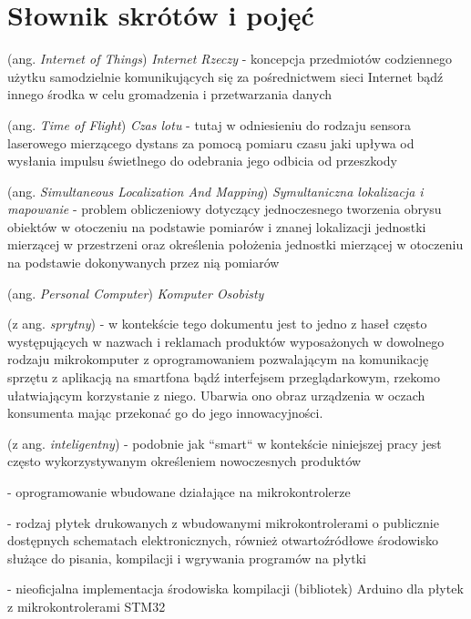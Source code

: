 \chapter*{Słownik skrótów i pojęć}\mbox{}
\label{sec:skroty}
\noindent
\begin{description}[labelwidth=*]
  \item  [IoT] (ang. \emph{Internet of Things}) \emph{Internet Rzeczy} - koncepcja przedmiotów codziennego użytku samodzielnie komunikujących się za pośrednictwem sieci Internet bądź innego środka w celu gromadzenia i przetwarzania danych
  
  \item [ToF] (ang. \emph{Time of Flight}) \emph{Czas lotu} - tutaj w odniesieniu do rodzaju sensora laserowego mierzącego dystans za pomocą pomiaru czasu jaki upływa od wysłania impulsu świetlnego do odebrania jego odbicia od przeszkody
  
  \item [SLAM] (ang. \emph{Simultaneous Localization And Mapping}) \emph{Symultaniczna lokalizacja i mapowanie} - problem obliczeniowy dotyczący jednoczesnego tworzenia obrysu obiektów w otoczeniu na podstawie pomiarów i znanej lokalizacji jednostki mierzącej w przestrzeni oraz określenia położenia jednostki mierzącej w otoczeniu na podstawie dokonywanych przez nią pomiarów
  
  \item [VSLAM]
  
  \item [LIDAR]
  
  \item [PC] (ang. \emph{Personal Computer}) \emph{Komputer Osobisty}
  
  \item [smart] (z ang. \emph{sprytny})  - w kontekście tego dokumentu jest to jedno z haseł często występujących w nazwach i reklamach produktów wyposażonych w dowolnego rodzaju mikrokomputer z oprogramowaniem pozwalającym na komunikację sprzętu z aplikacją na smartfona bądź interfejsem przeglądarkowym, rzekomo ułatwiającym korzystanie z niego. Ubarwia ono obraz urządzenia w oczach konsumenta mając przekonać go do jego innowacyjności. 
  
  \item [intelligent] (z ang. \emph{inteligentny})  - podobnie jak ``smart`` w kontekście niniejszej pracy jest często wykorzystywanym określeniem nowoczesnych produktów
  
  \item [Firmware] - oprogramowanie wbudowane działające na mikrokontrolerze
  
  \item [Arduino] - rodzaj płytek drukowanych z wbudowanymi mikrokontrolerami o publicznie dostępnych schematach elektronicznych, również otwartoźródłowe środowisko służące do pisania, kompilacji i wgrywania programów na płytki
  
  \item [STM32duino] - nieoficjalna implementacja środowiska kompilacji (bibliotek) Arduino dla płytek z mikrokontrolerami STM32
  
\end{description}
